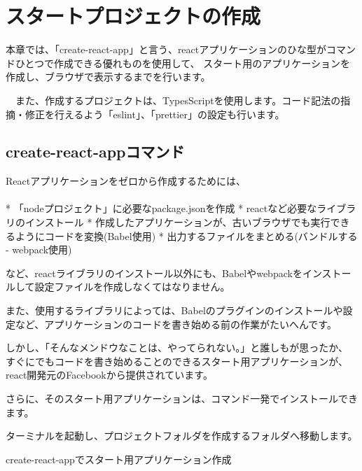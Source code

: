 \chapter{スタートプロジェクトの作成}
\label{chap:02-create-react-app}
\begin{starterabstract}
  本章では、「create{-}react{-}app」と言う、reactアプリケーションのひな型がコマンドひとつで作成できる優れものを使用して、
スタート用のアプリケーションを作成し、ブラウザで表示するまでを行います。

　また、作成するプロジェクトは、TypesScriptを使用します。コード記法の指摘・修正を行えるよう「eslint」、「prettier」の設定も行います。

\end{starterabstract}

\section{create{-}react{-}appコマンド}
\keeplastskip{
  \label{sec:2-1}
  \label{sec-01command}
  \par\nobreak
}

Reactアプリケーションをゼロから作成するためには、\\[0pt]
\\[0pt]
* 「nodeプロジェクト」に必要なpackage.jsonを作成
* reactなど必要なライブラリのインストール
* 作成したアプリケーションが、古いブラウザでも実行できるようにコードを変換(Babel使用)
* 出力するファイルをまとめる(バンドルする {-} webpack使用)

など、reactライブラリのインストール以外にも、Babelやwebpackをインストールして設定ファイルを作成しなくてはなりません。

また、使用するライブラリによっては、Babelのプラグインのインストールや設定など、アプリケーションのコードを書き始める前の作業がたいへんです。

しかし、「そんなメンドウなことは、やってられない。」と誰しもが思ったか、
すぐにでもコードを書き始めることのできるスタート用アプリケーションが、react開発元のFacebookから提供されています。

さらに、そのスタート用アプリケーションは、コマンド一発でインストールできます。

ターミナルを起動し、プロジェクトフォルダを作成するフォルダへ移動します。

\def\startercodeblockfontsize{}
\begin{starterterminal}[]{create{-}react{-}appでスタート用アプリケーション作成}\end{starterterminal}

